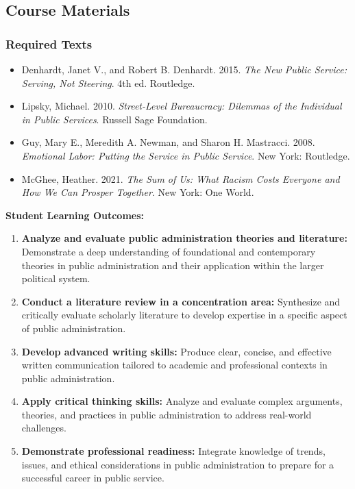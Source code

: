 \documentclass[12pt]{article}     %
\begin{document}
	\subsection*{Course Materials}
	\subsubsection*{Required Texts}
    \begin{itemize}
        \item Denhardt, Janet V., and Robert B. Denhardt. 2015. \textit{The New Public Service: Serving, Not Steering}. 4th ed. Routledge.
        \item Lipsky, Michael. 2010. \textit{Street-Level Bureaucracy: Dilemmas of the Individual in Public Services}. Russell Sage Foundation.
        \item Guy, Mary E., Meredith A. Newman, and Sharon H. Mastracci. 2008. \textit{Emotional Labor: Putting the Service in Public Service}. New York: Routledge.
        \item McGhee, Heather. 2021. \textit{The Sum of Us: What Racism Costs Everyone and How We Can Prosper Together}. New York: One World.
    \end{itemize}


\vspace{1em}
\noindent \textbf{Student Learning Outcomes:}
                   \begin{enumerate}
                        \item \textbf{Analyze and evaluate public administration theories and literature:} Demonstrate a deep understanding of foundational and contemporary theories in public administration and their application within the larger political system.
                        \item \textbf{Conduct a literature review in a concentration area:} Synthesize and critically evaluate scholarly literature to develop expertise in a specific aspect of public administration.
                        \item \textbf{Develop advanced writing skills:} Produce clear, concise, and effective written communication tailored to academic and professional contexts in public administration.
                        \item \textbf{Apply critical thinking skills:} Analyze and evaluate complex arguments, theories, and practices in public administration to address real-world challenges.
                        \item \textbf{Demonstrate professional readiness:} Integrate knowledge of trends, issues, and ethical considerations in public administration to prepare for a successful career in public service.
                  \end{enumerate}
\end{document}
